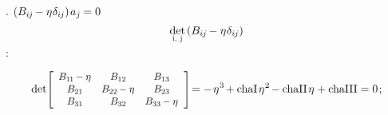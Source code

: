 \en{,}
.
 
${ ( B_{i\hspace{-0.1ex}j} \hspace{-0.15ex}
- \eta\hspace{.1ex} \delta_{i\hspace{-0.1ex}j} )
\hspace{.25ex} a_j \hspace{-0.1ex}
= 0 }$
\ru{,}
\begin{equation*}
\smash{%
   \underset{%
      \raisebox{.15em}{%
         \scalebox{.7}{ i, \hspace{.15ex}j }%
      } %
   } %
   { \operatorname{det} }%
} %
\hspace{.3ex}
( B_{i\hspace{-0.1ex}j} \hspace{-0.15ex} - \eigenvalue \delta_{ i \hspace{-0.1ex} j } )
\end{equation*}
:

\nopagebreak\vspace{-0.1em}
\begin{equation}\label{chardetequation}
\operatorname{det} \hspace{-0.4ex}
\scalebox{.9}[.92]{$
   \left[
      \begin{array}{ccc}
         B_{1\hspace{-0.1ex}1} \hspace{-0.16ex} - \eigenvalue & B_{12} & B_{13} \\
         B_{21} & B_{22} \hspace{-0.16ex} - \eigenvalue & B_{23} \\
         B_{31} & B_{32} & B_{33} \hspace{-0.16ex} - \eigenvalue
      \end{array}
   \hspace{.1ex}
   \right]
$} %
\hspace{-0.4ex} = - \hspace{.2ex}
\eigenvalue^3 \hspace{-0.25ex}
+ \firstcharacteristicinvariant \hspace{.25ex}
\eigenvalue^2 \hspace{-0.25ex}
- \secondcharacteristicinvariant \hspace{.25ex}
\eigenvalue
+ \thirdcharacteristicinvariant
= 0
\hspace{.2ex} ;
\end{equation}


